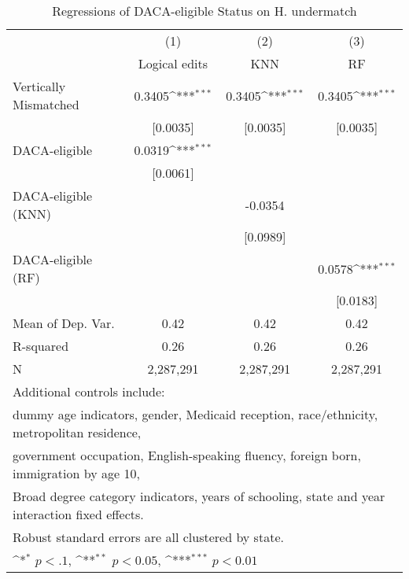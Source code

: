 \begin{table}[htbp]\centering
\def\sym#1{\ifmmode^{#1}\else\(^{#1}\)\fi}
\caption{Regressions of DACA-eligible Status on H. undermatch}
\begin{tabular}{l*{3}{c}}
\toprule
                    &\multicolumn{1}{c}{(1)}         &\multicolumn{1}{c}{(2)}         &\multicolumn{1}{c}{(3)}         \\
                    &Logical edits         &         KNN         &          RF         \\
\midrule
Vertically Mismatched&      0.3405\sym{***}&      0.3405\sym{***}&      0.3405\sym{***}\\
                    &    [0.0035]         &    [0.0035]         &    [0.0035]         \\
\addlinespace
DACA-eligible       &      0.0319\sym{***}&                     &                     \\
                    &    [0.0061]         &                     &                     \\
\addlinespace
DACA-eligible (KNN) &                     &     -0.0354         &                     \\
                    &                     &    [0.0989]         &                     \\
\addlinespace
DACA-eligible (RF)  &                     &                     &      0.0578\sym{***}\\
                    &                     &                     &    [0.0183]         \\
\midrule
Mean of Dep. Var.   &        0.42         &        0.42         &        0.42         \\
R-squared           &        0.26         &        0.26         &        0.26         \\
N                   &   2,287,291         &   2,287,291         &   2,287,291         \\
\bottomrule
\multicolumn{4}{l}{\footnotesize Additional controls include:}\\
\multicolumn{4}{l}{\footnotesize dummy age indicators, gender, Medicaid reception, race/ethnicity, metropolitan residence,}\\
\multicolumn{4}{l}{\footnotesize government occupation, English-speaking fluency, foreign born, immigration by age 10,}\\
\multicolumn{4}{l}{\footnotesize Broad degree category indicators, years of schooling, state and year interaction fixed effects.}\\
\multicolumn{4}{l}{\footnotesize Robust standard errors are all clustered by state.}\\
\multicolumn{4}{l}{\footnotesize \sym{*} \(p<.1\), \sym{**} \(p<0.05\), \sym{***} \(p<0.01\)}\\
\end{tabular}
\end{table}
